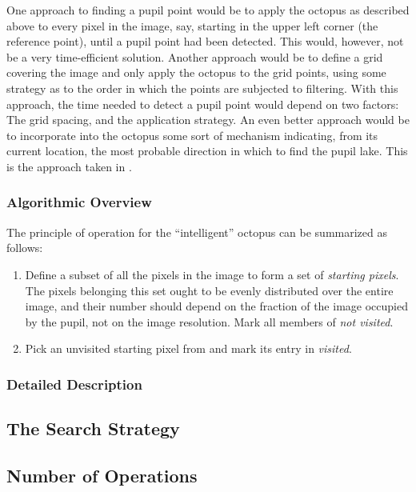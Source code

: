 One approach to finding a pupil point would be to apply the octopus as
described above to every pixel in the image, say, starting in the
upper left corner (the reference point), until a pupil point had been
detected.  This would, however, not be a very time-efficient solution.
Another approach would be to define a grid covering the image and only
apply the octopus to the grid points, using some strategy as to the
order in which the points are subjected to filtering.  With this
approach, the time needed to detect a pupil point would depend on two
factors: The grid spacing, and the application strategy.  An even
better approach would be to incorporate into the octopus some sort of
mechanism indicating, from its current location, the most probable
direction in which to find the pupil lake.  This is the approach taken
in {\octopus}.

\subsubsection{Algorithmic Overview}

The principle of operation for the ``intelligent'' octopus can be
summarized as follows:
\begin{enumerate}
\item Define a subset of all the pixels in the image to form a set
  {\SS} of {\em starting pixels\/}.  The pixels belonging this set
  ought to be evenly distributed over the entire image, and their
  number should depend on the fraction of the image occupied by the
  pupil, not on the image resolution.  Mark all members of {\SS} {\sl
    not visited\/}.
\item Pick an unvisited starting pixel from {\SS} and mark its entry
  in {\SS} {\sl visited\/}.
\end{enumerate}

\subsubsection{Detailed Description}

\subsection{The Search Strategy}
\label{algo:seek:strategy}

\subsection{Number of Operations}
\label{algo:seek:O}


